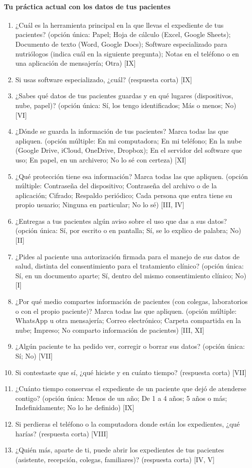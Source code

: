 \documentclass[12pt, a4paper]{article}
\begin{document}
\paragraph{Tu práctica actual con los datos de tus pacientes}
\begin{enumerate}
  \item ¿Cuál es la herramienta principal en la que llevas el expediente de tus pacientes? (opción única: Papel; Hoja de cálculo (Excel, Google Sheets); Documento de texto (Word, Google Docs); Software especializado para nutriólogos (indica cuál en la siguiente pregunta); Notas en el teléfono o en una aplicación de mensajería; Otra) [IX]
  \item Si usas software especializado, ¿cuál? (respuesta corta) [IX]
  \item ¿Sabes qué datos de tus pacientes guardas y en qué lugares (dispositivos, nube, papel)? (opción única: Sí, los tengo identificados; Más o menos; No) [VI]
  \item ¿Dónde se guarda la información de tus pacientes? Marca todas las que apliquen. (opción múltiple: En mi computadora; En mi teléfono; En la nube (Google Drive, iCloud, OneDrive, Dropbox); En el servidor del software que uso; En papel, en un archivero; No lo sé con certeza) [XI]
  \item ¿Qué protección tiene esa información? Marca todas las que apliquen. (opción múltiple: Contraseña del dispositivo; Contraseña del archivo o de la aplicación; Cifrado; Respaldo periódico; Cada persona que entra tiene su propio usuario; Ninguna en particular; No lo sé) [III, IV]
  \item ¿Entregas a tus pacientes algún aviso sobre el uso que das a sus datos? (opción única: Sí, por escrito o en pantalla; Sí, se lo explico de palabra; No) [II]
  \item ¿Pides al paciente una autorización firmada para el manejo de sus datos de salud, distinta del consentimiento para el tratamiento clínico? (opción única: Sí, en un documento aparte; Sí, dentro del mismo consentimiento clínico; No) [I]
  \item ¿Por qué medio compartes información de pacientes (con colegas, laboratorios o con el propio paciente)? Marca todas las que apliquen. (opción múltiple: Whats\-App u otra mensajería; Correo electrónico; Carpeta compartida en la nube; Impreso; No comparto información de pacientes) [III, XI]
  \item ¿Algún paciente te ha pedido ver, corregir o borrar sus datos? (opción única: Sí; No) [VII]
  \item Si contestaste que sí, ¿qué hiciste y en cuánto tiempo? (respuesta corta) [VII]
  \item ¿Cuánto tiempo conservas el expediente de un paciente que dejó de atenderse contigo? (opción única: Menos de un año; De 1 a 4 años; 5 años o más; Indefinidamente; No lo he definido) [IX]
  \item Si perdieras el teléfono o la computadora donde están los expedientes, ¿qué harías? (respuesta corta) [VIII]
  \item ¿Quién más, aparte de ti, puede abrir los expedientes de tus pacientes (asistente, recepción, colegas, familiares)? (respuesta corta) [IV, V]
\end{enumerate}
 
\end{document}
